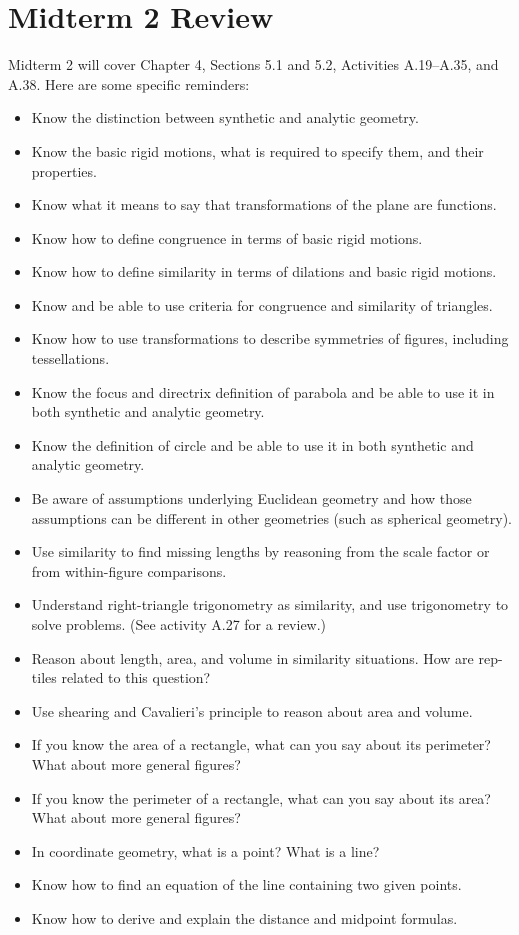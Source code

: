 \newpage

\section{Midterm 2 Review}

Midterm 2 will cover Chapter 4, Sections 5.1 and 5.2, Activities A.19--A.35, and A.38. Here are some specific reminders:  
\begin{itemize}\itemsep-3pt
\item Know the distinction between synthetic and analytic geometry.
\item Know the basic rigid motions, what is required to specify them, and their properties. 
\item Know what it means to say that transformations of the plane are functions.  
\item Know how to define congruence in terms of basic rigid motions. 
\item Know how to define similarity in terms of dilations and basic rigid motions.  
\item Know and be able to use criteria for congruence and similarity of triangles.  
\item Know how to use transformations  to describe symmetries of figures, including tessellations.  
\item Know the focus and directrix definition of parabola and be able to use it in both synthetic and analytic geometry.
\item Know the definition of circle and be able to use it in both synthetic and analytic geometry.
\item Be aware of assumptions underlying Euclidean geometry and how those assumptions can be different in other geometries (such as spherical geometry).  
\item Use similarity to find missing lengths by reasoning from the scale factor or from within-figure comparisons.   
\item Understand right-triangle trigonometry as similarity, and use trigonometry to solve problems.  (See activity A.27 for a review.)
\item Reason about length, area, and volume in similarity situations.  How are rep-tiles related to this question?  
\item Use shearing and Cavalieri's principle to reason about area and volume.  
\item If you know the area of a rectangle, what can you say about its perimeter?  What about more general figures?  
\item If you know the perimeter of a rectangle, what can you say about its area?  What about more general figures? 
\item In coordinate geometry, what is a point?  What is a line?  
\item Know how to find an equation of the line containing two given points.  
\item Know how to derive and explain the distance and midpoint formulas. 
\end{itemize}


